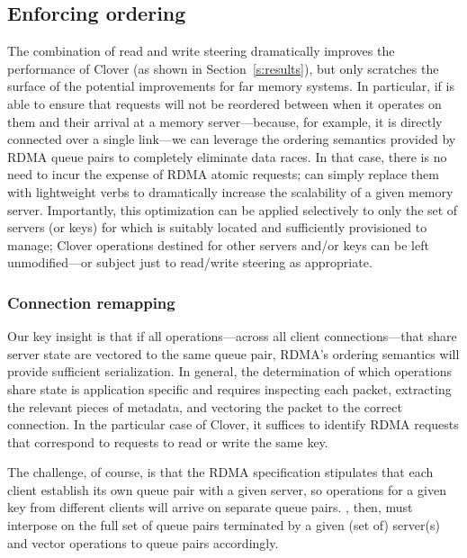 \subsection{Enforcing ordering}

The combination of read and write steering dramatically improves the
performance of Clover (as shown in Section~\ref{s:results}), but only
scratches the surface of the potential improvements for far memory
systems.  In particular, if {\sword} is able to ensure that
requests will not be reordered between when it operates on them and
their arrival at a memory server---because, for example, it is
directly connected over a single link---we can leverage the ordering
semantics provided by RDMA queue pairs to completely eliminate data
races.  In that case, there is no need to incur the expense of RDMA
atomic requests; {\sword} can simply replace them with lightweight verbs
to dramatically increase the scalability of a given memory server.
Importantly, this optimization can be applied selectively to only the
set of servers (or keys) for which {\sword} is suitably located
and sufficiently provisioned to manage; Clover operations destined
for other servers and/or keys can be left unmodified---or subject just
to read/write steering as appropriate.

\subsubsection{Connection remapping}

Our key insight is that if all operations---across all client
connections---that share server state are vectored to the same queue
pair, RDMA's ordering semantics will provide sufficient serialization.
In general, the determination of which operations share state is
application specific and requires inspecting each packet, extracting
the relevant pieces of metadata, and vectoring the packet to the
correct connection.  In the particular case of Clover, it suffices to
identify RDMA requests that correspond to requests to read or write
the same key.


The challenge, of course, is that the RDMA specification stipulates
that each client establish its own queue pair with a given server, so
operations for a given key from different clients will arrive on
separate queue pairs.  \sword, then, must interpose on the
full set of queue pairs terminated by a given (set of) server(s) and
vector operations to queue pairs accordingly.


